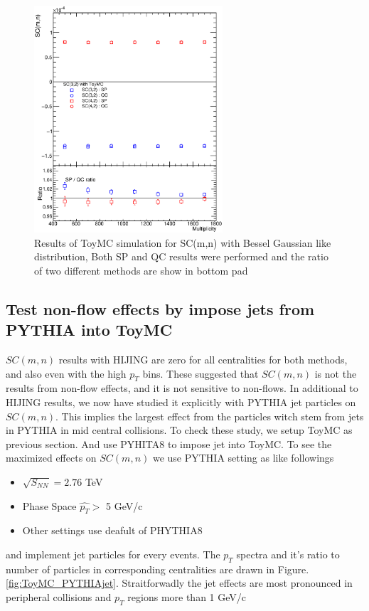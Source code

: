 \begin{figure}[h]
\centerline{\includegraphics[width=7.0cm]{figures/figs_ToyMC/SC_Comparison_SC_ToyMC_gaus.eps}
}
\caption{Results of ToyMC simulation for SC(m,n) with Bessel Gaussian like distribution, Both SP and QC results were performed and the ratio of two different methods are show in bottom pad}
\label{fig:ToyMC_Gaus}
\end{figure}

\bigskip

\subsection{Test non-flow effects by impose jets from PYTHIA into ToyMC}

$SC(m,n)$ results with HIJING are zero for all centralities for both methods, and also even with the high $p_T$ bins. These suggested that $SC(m,n)$ is not the results from non-flow effects, and it is not sensitive to non-flows. In additional to HIJING results, we now have studied it explicitly with PYTHIA jet particles on $SC(m,n)$. This implies the largest effect from the particles witch stem from jets in PYTHIA in mid central collisions. To check these study, we setup ToyMC as previous section. And use PYHITA8 to impose jet into ToyMC. To see the maximized effects on $SC(m,n)$ we use PYTHIA setting as like followings
\begin{itemize}
	\item $\sqrt{S_{NN}}= 2.76$ TeV 
	\item Phase Space $\hat{p_T} >$  5 GeV/c
	\item Other settings use deafult of PHYTHIA8
\end{itemize}
	and implement jet particles for every events. The $p_T$ spectra and it's ratio to number of  particles in corresponding centralities are drawn in Figure. \ref{fig:ToyMC_PYTHIAjet}. Straitforwadly the jet effects are most pronounced in peripheral collisions and $p_T$ regions more than 1 GeV/c
	
